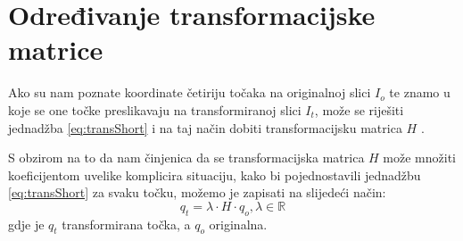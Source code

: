 \section{Određivanje transformacijske matrice}
\label{sec:odredjivanjeTransMat}

Ako su nam poznate koordinate četiriju točaka na originalnoj slici $I_o$ te znamo u koje se one točke preslikavaju na transformiranoj slici $I_t$, može se riješiti jednadžba \eqref{eq:transShort} i na taj način dobiti transformacijsku matrica $H$ \citep{segvicDinAn3D}.

S obzirom na to da nam činjenica da se transformacijska matrica $H$ može množiti koeficijentom uvelike komplicira situaciju, kako bi pojednostavili jednadžbu \eqref{eq:transShort} za svaku točku, možemo je zapisati na slijedeći način:
\begin{equation}
q_t = \lambda \cdot H \cdot q_o, \lambda \in \mathbb{R}
\label{eq:transMatSimpler}
\end{equation}
gdje je $q_t$ transformirana točka, a $q_o$ originalna.

